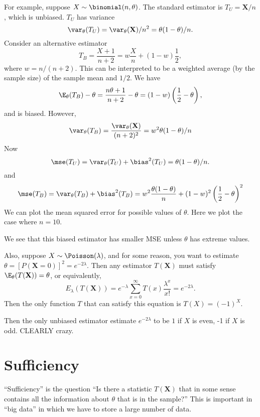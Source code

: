 \documentclass[a4paper]{article}
\begin{document}
For example, suppose $X\sim \binomial(n, \theta)$. The standard estimator is $T_U = \mathbf{X}/n$, which is unbiased. $T_U$ has variance
\[
  \var_\theta(T_U) = \var_\theta(\mathbf{X})/n^2 = \theta(1 - \theta)/n.
\]
Consider an alternative estimator 
\[
  T_B = \frac{X + 1}{n + 2} = w\frac{X}{n} + (1 - w)\frac{1}{2},
\]
where $w = n/(n + 2)$. This can be interpreted to be a weighted average (by the sample size) of the sample mean and $1/2$. We have
\[
  \E_\theta(T_B) - \theta = \frac{n\theta + 1}{n + 2} - \theta = (1 - w)\left(\frac{1}{2} - \theta\right),
\]
and is biased. However,
\[
  \var_\theta(T_B) = \frac{\var_\theta(\mathbf{X})}{(n + 2)^2} = w^2\theta(1 - \theta)/n
\]
Now
\[
  \mse (T_U) = \var_\theta(T_U) + \bias^2(T_U) = \theta(1 - \theta)/n.
\]
and
\[
  \mse (T_B) = \var_\theta(T_B) + \bias^2(T_B) = w^2\frac{\theta(1 - \theta)}{n} + (1 - w)^2\left(\frac{1}{2} - \theta\right)^2
\]
We can plot the mean squared error for possible values of $\theta$. Here we plot the case where $n = 10$.
\begin{center}
\end{center}
We see that this biased estimator has smaller MSE unless $\theta$ has extreme values.

Also, suppose $X\sim \Poisson(\lambda)$, and for some reason, you want to estimate $\theta = [P(\mathbf{X} = 0)]^2 = e^{-2\lambda}$. Then any estimator $T(\mathbf{X})$ must satisfy $\E_\theta(T(\mathbf{X})) = \theta$, or equivalently,
\[
  E_\lambda(T(\mathbf{X})) = e^{-\lambda}\sum_{x = 0}^\infty T(x) \frac{\lambda^x}{x!} = e^{-2\lambda}.
\]
Then the only function $T$ that can satisfy this equation is $T(X) = (-1)^X$.

Then the only unbiased estimator estimate $e^{-2\lambda}$ to be $1$ if $X$ is even, -1 if $X$ is odd. CLEARLY crazy. 
\section{Sufficiency}
``Sufficiency'' is the question ``Is there a statistic $T(\mathbf{X})$ that in some sense contains all the information about $\theta$ that is in the sample?'' This is important in ``big data'' in which we have to store a large number of data.
\end{document}
